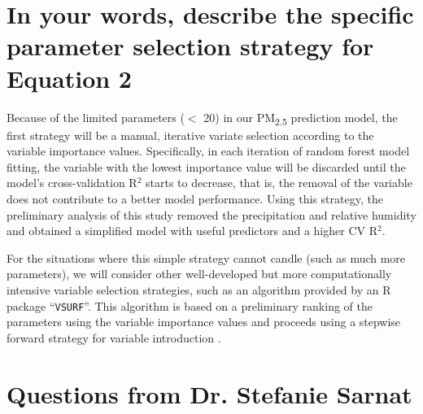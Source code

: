 \documentclass[11pt]{article}
\newcommand{\tsub}{\textsubscript}
\begin{document}
\section{In your words, describe the specific parameter selection strategy for Equation 2}
\begin{enumerate*}[{[1)]}]
    \item Because of the limited parameters ($<$ 20) in our PM\tsub{2.5} prediction model, the first strategy will be a manual, iterative variate selection according to the variable importance values. Specifically, in each iteration of random forest model fitting, the variable with the lowest importance value will be discarded until the model's cross-validation R$^2$ starts to decrease, that is, the removal of the variable does not contribute to a better model performance. Using this strategy, the preliminary analysis of this study removed the precipitation and relative humidity and obtained a simplified model with useful predictors and a higher CV R$^2$. 
    \item For the situations where this simple strategy cannot candle (such as much more parameters), we will consider other well-developed but more computationally intensive variable selection strategies, such as an algorithm provided by an R package ``\texttt{VSURF}''. This algorithm is based on a preliminary ranking of the parameters using the variable importance values and proceeds using a stepwise forward strategy for variable introduction \citep{genuer2015vsurf}.
\end{enumerate*}



\hdashrule{\textwidth}{0.1pt}{0.6mm 0.6mm}
\setcounter{section}{0}

\section*{Questions from Dr. Stefanie Sarnat}
\end{document}

